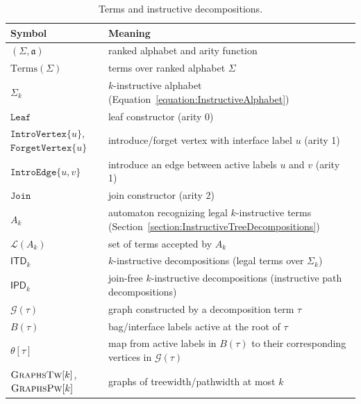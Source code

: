 \documentclass[11pt,a4paper]{article}
\newcommand{\treeautomaton}{A}
\newcommand{\lang}{\mathcal{L}}
\newcommand{\decompositiongraph}[1]{\mathcal{G}(#1)}
\newcommand{\introvertextype}[1]{\mathtt{IntroVertex}\{#1\}}
\newcommand{\introedgetype}[2]{\mathtt{IntroEdge}\{#1,#2\}}
\newcommand{\forgetvertextype}[1]{\mathtt{ForgetVertex}\{#1\}}
\newcommand{\jointype}{\mathtt{Join}}
\newcommand{\leaftype}{\mathtt{Leaf}}
\newcommand{\arity}{\mathfrak{a}}
\newcommand{\allabstractdecompositionspathwidth}[1]{\mathsf{IPD}_{#1}}
\newcommand{\allabstractdecompositionstreewidth}[1]{\mathsf{ITD}_{#1}}
\newcommand{\abstractalphabet}[1]{\Sigma_{#1}}
\newcommand{\Terms}[1]{\mathrm{Terms}(#1)}
\newcommand{\allgraphstreewidth}[1]{\textsc{GraphsTw}[#1]}
\newcommand{\allgraphspathwidth}[1]{\textsc{GraphsPw}[#1]}
\begin{document}
\begin{table}[H]
\centering
\footnotesize
\begin{tabularx}{\textwidth}{@{}lX@{}}
\hline
\textbf{Symbol} & \textbf{Meaning} \\
\hline
$(\Sigma,\arity)$ & ranked alphabet and arity function \\
$\Terms{\Sigma}$ & terms over ranked alphabet $\Sigma$ \\
$\abstractalphabet{k}$ & $k$-instructive alphabet (Equation~\eqref{equation:InstructiveAlphabet}) \\
$\leaftype$ & leaf constructor (arity 0) \\
$\introvertextype{u}$, $\forgetvertextype{u}$ & introduce/forget vertex with interface label $u$ (arity 1) \\
$\introedgetype{u}{v}$ & introduce an edge between active labels $u$ and $v$ (arity 1) \\
$\jointype$ & join constructor (arity 2) \\
$\treeautomaton_k$ & automaton recognizing legal $k$-instructive terms (Section~\ref{section:InstructiveTreeDecompositions}) \\
$\lang(\treeautomaton_k)$ & set of terms accepted by $\treeautomaton_k$ \\
$\allabstractdecompositionstreewidth{k}$ & $k$-instructive decompositions (legal terms over $\abstractalphabet{k}$) \\
$\allabstractdecompositionspathwidth{k}$ & join-free $k$-instructive decompositions (instructive path decompositions) \\
$\decompositiongraph{\tau}$ & graph constructed by a decomposition term $\tau$ \\
$B(\tau)$ & bag/interface labels active at the root of $\tau$ \\
$\theta[\tau]$ & map from active labels in $B(\tau)$ to their corresponding vertices in $\decompositiongraph{\tau}$ \\
$\allgraphstreewidth{k}$, $\allgraphspathwidth{k}$ & graphs of treewidth/pathwidth at most $k$ \\
\hline
\end{tabularx}
\caption{Terms and instructive decompositions.}
\label{table:notation-decompositions}
\end{table}
\end{document}
